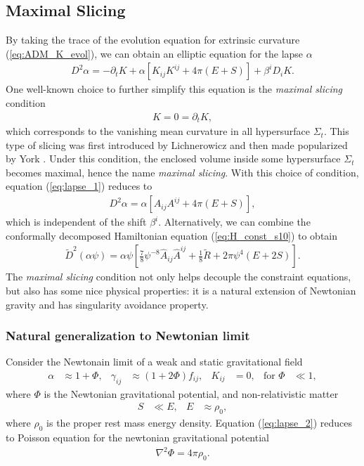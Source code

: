 \subsection{Maximal Slicing} 
\label{section2.4.1}
By taking the trace of the evolution equation for extrinsic curvature (\ref{eq:ADM_K_evol}),
we can obtain an elliptic equation for the lapse $\alpha$
\begin{align}\label{eq:lapse_1}
    D^2 \alpha = - \partial_t K + \alpha \left[ K_{ij} K^{ij} + 4\pi\left(E+S\right) \right] + \beta^i D_i K.
\end{align}
One well-known choice to further simplify this equation is the \textit{maximal slicing} condition
\begin{align}\label{eq:max_slicing}
    K = 0 = \partial_t K,
\end{align}
which corresponds to the vanishing mean curvature in all hypersurface $\Sigma_t$.
This type of slicing was first introduced by Lichnerowicz \cite{lichnerowicz1944integration}
and then made popularized by York \cite{smarr1979sources,smarr1978radiation}.
Under this condition, the enclosed volume inside some hypersurface $\Sigma_t$ becomes maximal,
hence the name \textit{maximal slicing}.
With this choice of condition, equation (\ref{eq:lapse_1}) reduces to
\begin{align}\label{eq:lapse_2}
    D^2 \alpha = \alpha \left[ A_{ij} A^{ij} + 4\pi\left(E+S\right) \right],
\end{align}
which is independent of the shift $\beta^i$.
Alternatively, we can combine the conformally decomposed Hamiltonian equation (\ref{eq:H_const_s10}) to obtain
\begin{align}\label{eq:lapse_con}
    \tilde{D}^2 \left(\alpha \psi \right) = \alpha \psi \left[ \frac{7}{8} \psi^{-8} \hat{A}_{ij} \hat{A}^{ij} + \frac{1}{8} \tilde{R}
    + 2 \pi \psi^4 \left(E + 2 S \right) \right].
\end{align}
The \textit{maximal slicing} condition not only helps decouple the constraint equations,
but also has some nice physical properties:
it is a natural extension of Newtonian gravity and has singularity avoidance property.

\subsubsection{Natural generalization to Newtonian limit}
Consider the Newtonain limit of a weak and static gravitational field
\begin{align}
    \alpha &\approx 1 + \Phi, & \gamma_{ij} &\approx \left(1 + 2\Phi \right) f_{ij}, & K_{ij} &=0, & \text{for } \Phi &\ll 1,
\end{align}
where $\Phi$ is the Newtonian gravitational potential,
and non-relativistic matter
\begin{align}
    S &\ll E, & E &\approx \rho_0,
\end{align}
where $\rho_0$ is the proper rest mass energy density.
Equation (\ref{eq:lapse_2}) reduces to Poisson equation for the newtonian gravitational potential
\begin{align}
    \nabla^2 \Phi = 4\pi \rho_0.
\end{align}

